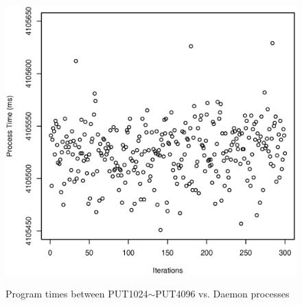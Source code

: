 \documentclass[10pt]{article}
\begin{document}
\begin{figure}[htp!]
{		\includegraphics[scale=0.35]{put4096_pt.eps}
		\label{fig:put4096_pt}
	}
	\caption{Program times between PUT1024$\sim$PUT4096 vs. Daemon processes~\label{fig:put_daemon_pt4}}
\end{figure}
\end{document}
